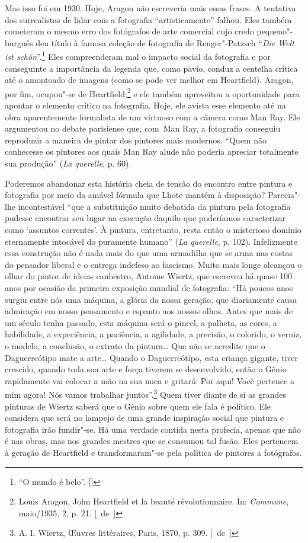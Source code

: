 Mas isso foi em 1930. Hoje, Aragon não escreveria mais essas frases. A
tentativa dos surrealistas de lidar com a fotografia ``artisticamente''
falhou. Eles também cometeram o mesmo erro dos fotógrafos de arte
comercial cujo credo pequeno"-burguês deu título à famosa
coleção de fotografia de Renger"-Patzsch ``\emph{Die Welt ist schön}''.\footnote{``O mundo é belo''. []} Eles compreenderam mal o impacto social da
fotografia e por conseguinte a importância da legenda que, como pavio, conduz a
centelha crítica até o amontoado de imagens (como se pode ver melhor em
Heartfield). Aragon, por fim, ocupou"-se de Heartfield;\footnote{Louis
  Aragon, John Heartfield et la beauté révolutionnaire. In: \emph{Commune},
  maio/1935, 2, p. 21. [~de~]} e ele também aproveitou a oportunidade
para apontar o elemento crítico na fotografia. Hoje, ele avista esse
elemento até na obra aparentemente formalista de um virtuoso com a câmera
como Man Ray. Ele argumentou no debate parisiense que, com~Man Ray, a
fotografia conseguiu reproduzir a maneira de pintar dos pintores mais
modernos. ``Quem não conhecesse os pintores aos quais Man Ray alude não
poderia apreciar totalmente sua produção'' (\emph{La querelle}, p. 60).

Poderemos abandonar esta história cheia de tensão do encontro entre
pintura e fotografia por meio da amável fórmula que Lhote mantém à
disposição? Parecia"-lhe incontestável ``que a substituição muito
debatida da pintura pela fotografia pudesse encontrar seu lugar na
execução daquilo que poderíamos caracterizar como `assuntos correntes'. À
pintura, entretanto, resta então o misterioso domínio eternamente
intocável do puramente humano'' (\emph{La querelle}, p. 102).
Infelizmente essa construção não é nada mais do que uma armadilha que
se arma nas costas do pensador liberal e o entrega indefeso ao fascismo.
Muito mais longe alcançou o olhar do pintor de ideias canhestro, Antoine
Wiertz, que escreveu há quase 100 anos por ocasião da primeira exposição
mundial de fotografia: ``Há poucos anos surgiu entre nós uma máquina, a
glória da nossa geração, que diariamente causa admiração em nosso
pensamento e espanto aos nossos olhos. Antes que mais de um século tenha
passado, esta máquina será o pincel, a palheta, as cores, a habilidade,
a experiência, a paciência, a agilidade, a precisão, o colorido, o
verniz, o modelo, a conclusão, o extrato da pintura\ldots{} Que não se
acredite que o Daguerreótipo mate a arte\ldots{} Quando o Daguerreótipo, esta
criança gigante, tiver crescido, quando toda sua arte e força tiverem se
desenvolvido, então o Gênio rapidamente vai colocar a mão na sua nuca e
gritará: Por aqui! Você pertence a mim agora! Nós vamos trabalhar
juntos''.\footnote{A. I. Wiertz, \OE uvres littéraires, Paris, 1870, p. 309. [~de~]}
Quem tiver diante de si as grandes pinturas de Wiertz saberá que o Gênio
sobre quem ele fala é político. Ele considera que será no lampejo de uma
grande inspiração social que pintura e fotografia irão fundir"-se. Há uma
verdade contida nesta profecia, apenas que não é nas obras, mas nos
grandes mestres que se consumou tal fusão. Eles pertencem à geração de
Heartfield e transformaram"-se pela política de pintores a fotógrafos.


